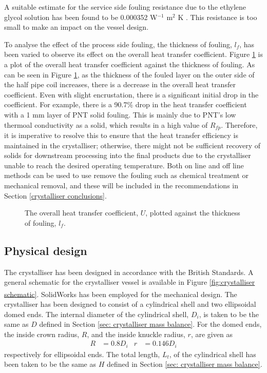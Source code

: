 A suitable estimate for the service side fouling resistance due to the ethylene glycol solution has been found to be 0.000352 W$^{-1}$ m$^2$ K \cite{fouling}. This resistance is too small to make an impact on the vessel design. 

To analyse the effect of the process side fouling, the thickness of fouling, $l_f$, has been varied to observe its effect on the overall heat transfer coefficient. Figure \ref{fig:fouling sensitivity} is a plot of the overall heat transfer coefficient against the thickness of fouling. As can be seen in Figure \ref{fig:fouling sensitivity}, as the thickness of the fouled layer on the outer side of the half pipe coil increases, there is a decrease in the overall heat transfer coefficient. Even with slight encrustation, there is a significant initial drop in the coefficient. For example, there is a 90.7\% drop in the heat transfer coefficient with a 1 mm layer of PNT solid fouling. This is mainly due to PNT's low thermoal conductivity as a solid, which results in a high value of $R_{fp}$. Therefore, it is imperative to resolve this to ensure that the heat transfer efficiency is maintained in the crystalliser; otherwise, there might not be sufficient recovery of solids for downstream processing into the final products due to the crystalliser unable to reach the desired operating temperature. Both on line and off line methods can be used to use remove the fouling such as chemical treatment or mechanical removal, and these will be included in the recommendations in Section \ref{crystalliser conclusions}.

\begin{figure}[h]
    \centering
    
    \caption{The overall heat transfer coefficient, $U$, plotted against the thickness of fouling, $l_f$.}
    \label{fig:fouling sensitivity}
\end{figure}



\subsection{Physical design} \label{sec:physical design crystalliser}

The crystalliser has been designed in accordance with the British Standards. A general schematic for the crystalliser vessel is available in Figure \ref{fig:crystalliser schematic}.  SolidWorks\textsuperscript{\textregistered} has been employed for the mechanical design. The crystalliser has been designed to consist of a cylindrical shell and two ellipsoidal domed ends. The internal diameter of the cylindrical shell, $D_i$, is taken to be the same as $D$ defined in Section \ref{sec: crystalliser mass balance}. For the domed ends, the inside crown radius, $R$, and the inside knuckle radius, $r$, are given as 
\begin{align}
    R &= 0.8 D_i &
    r &= 0.146 D_i
\end{align}
respectively for ellipsoidal ends. The total length, $L_t$, of the cylindrical shell has been taken to be the same as $H$ defined in Section \ref{sec: crystalliser mass balance}. 


